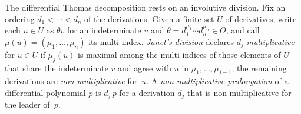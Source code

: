 \documentclass{article}
\theoremstyle{definition}
\theoremstyle{plain}
\begin{document}

\smallskip
The differential Thomas decomposition rests on an involutive division.  Fix
an ordering $d_1 < \cdots < d_n$ of the derivations.  Given a finite set $U$ of
derivatives, write each $u \in U$ as $\theta v$ for an indeterminate $v$ and
$\theta = d_1^{\mu_1} \cdots d_n^{\mu_n} \in \Theta$, and call
$\mu(u) = (\mu_1, \ldots, \mu_n)$ its multi-index.  {\it Janet's division}
declares $d_j$ {\it multiplicative} for $u \in U$ if $\mu_j(u)$ is maximal among
the multi-indices of those elements of $U$ that share the indeterminate $v$ and
agree with $u$ in $\mu_1, \ldots, \mu_{j-1}$; the remaining derivations are {\it
non-multiplicative} for~$u$.  A {\it non-multiplicative prolongation} of a
differential polynomial $p$ is $d_j\, p$ for a derivation $d_j$ that is
non-multiplicative for the leader of~$p$.
\end{document}

